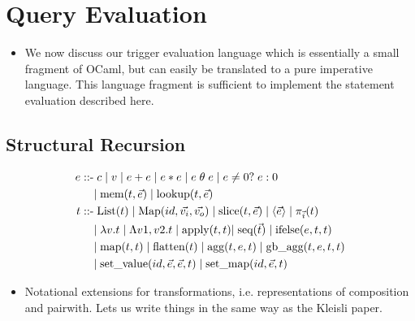 \section{Query Evaluation}

\begin{itemize}
  \item We now discuss our trigger evaluation language which is essentially a
  small fragment of OCaml, but can easily be translated to a pure imperative
  language. This language fragment is sufficient to implement the statement
  evaluation described here.
\end{itemize}

\subsection{Structural Recursion}

\def\ktclist{\mbox{List}}
\def\ktcmap{\mbox{Map}}
\def\apply{\mbox{apply}}
\def\seq{\mbox{seq}}
\def\ifelse{\mbox{ifelse}}
\def\mem{\mbox{mem}}
\def\lookup{\mbox{lookup}}
\def\slice{\mbox{slice}}
\def\setval{\mbox{set\_value}}
\def\setmap{\mbox{set\_map}}
\def\ktmap{\mbox{map}}
\def\ktflat{\mbox{flatten}}
\def\ktagg{\mbox{agg}}
\def\ktgb{\mbox{gb\_agg}}
\def\ktpwl{\mbox{pairwith}_1}
\def\ktpwr{\mbox{pairwith}_2}
\def\ktext{\mbox{ext}}
\def\ktid{\mbox{id}}

\begin{align*}
e \; \mbox{::-} & \; c \;|\; v \;|\; e + e \;|\; e * e \;|\; e \; \theta \; e
\;|\; e \neq 0?\; e : 0 \\
& |\; \mem(t,\vec{e}) \;|\; \lookup(t,\vec{e})\\
t \; \mbox{::-} & \; \ktclist(t) \;|\; \ktcmap(id,\vec{v_i},\vec{v_o})
  \; | \; \slice(t,\vec{e}) \;|\; \tuple{\vec{e}} \;|\; \pi_{\vec{i}}(t) \\
& |\; \lambda v . t \;|\; \Lambda v1,v2.t \;|\; \apply(t,t)
  |\; \seq(\vec{t}) \;|\; \ifelse(e,t,t) \\
& |\; \ktmap(t,t) \;|\; \ktflat(t) \;|\; \ktagg(t,e,t) \;|\; \ktgb(t,e,t,t)\\
& |\; \setval(id,\vec{e},\vec{e},t) \;|\; \setmap(id,\vec{e},t)
\end{align*}

\begin{itemize}
  \item Notational extensions for transformations, i.e. representations of
  composition and pairwith. Lets us write things in the same way as the Kleisli
  paper.
\end{itemize}

